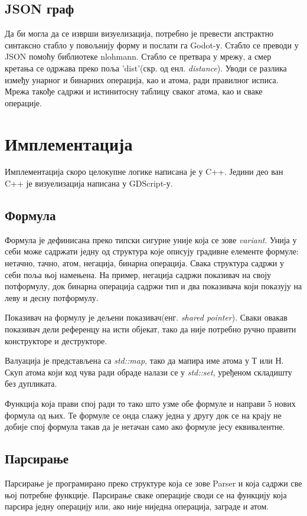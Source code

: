 \documentclass[a4paper,10pt]{article}
\begin{document}
\subsection{JSON граф}
Да би могла да се изврши визуелизација, потребно је превести апстрактно синтаксно стабло у повољнију форму и послати га Godot-у. Стабло се преводи у JSON помоћу библиотеке nlohmann. Стабло се претвара у мрежу, а смер кретања се одржава преко поља 'dist'(скр. од енл. \textit{distance}). Уводи се разлика између унарног и бинарних операција, као и атома, ради правилног исписа. Мрежа такође садржи и истинитосну таблицу сваког атома, као и сваке операције.

\section{Имплементација}
\label{sec:implementacija}

Имплементација скоро целокупне логике написана је у C++. Једини део ван C++ је визуелизација написана у GDScript-у.

\subsection{Формула}
Формула је дефинисана преко типски сигурне уније која се зове \textit{variant}. Унија у себи може садржати једну од структура које описују градивне елементе формуле: нетачно, тачно, атом, негација, бинарна операција. Свака структура садржи у себи поља њој намењена. На пример, негација садржи показивач на своју потформулу, док бинарна операција садржи тип и два показивача који показују на леву и десну потформулу.\cite{ar_vezbe}

Показивач на формулу је дељени показивач(енг. \textit{shared pointer}). Сваки овакав показивач дели референцу на исти објекат, тако да није потребно ручно правити конструкторе и деструкторе.\cite{ar_vezbe}

Валуација је представљена са \textit{std::map}, тако да мапира име атома у Т или Н. Скуп атома који код чува ради обраде налази се у \textit{std::set}, уређеном складишту без дупликата.\cite{ar_vezbe}

Функција која прави спој ради то тако што узме обе формуле и направи 5 нових формула од њих. Те формуле се онда слажу једна у другу док се на крају не добије спој формула такав да је нетачан само ако формуле јесу еквивалентне.

\subsection{Парсирање}
Парсирање је програмирано преко структуре која се зове Parser и која садржи све њој потребне функције. Парсирање сваке операције своди се на функцију која парсира једну операцију или, ако није ниједна операција, заграде и атом.
\end{document}
